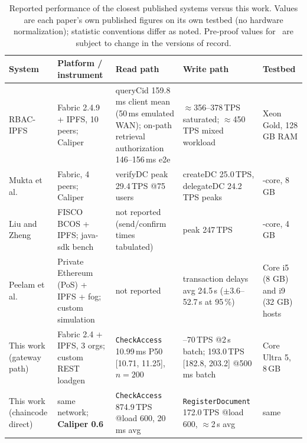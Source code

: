 \documentclass[preprint,12pt]{elsarticle}
\begin{document}
\begin{table}[!t]
\centering
\scriptsize
\renewcommand{\arraystretch}{1.25}
\caption{Reported performance of the closest published systems versus
this work. Values are each paper's own published figures on its own
testbed (no hardware normalization); statistic conventions differ as
noted. Pre-proof values for~\cite{liu2026rbacipfs,notash2026adaptive}
are subject to change in the versions of record.}
\label{tab:numbers_comparison}
\begin{tabularx}{\textwidth}{@{} >{\raggedright\arraybackslash}p{2.4cm}
  >{\raggedright\arraybackslash}p{2.4cm}
  >{\raggedright\arraybackslash}X
  >{\raggedright\arraybackslash}X
  >{\raggedright\arraybackslash}p{2.1cm} @{}}
\toprule
\textbf{System} & \textbf{Platform / instrument} &
\textbf{Read path} & \textbf{Write path} & \textbf{Testbed} \\
\midrule
RBAC-IPFS~\cite{liu2026rbacipfs} &
Fabric 2.4.9 + IPFS, 10 peers; Caliper &
queryCid 159.8\,ms client mean (50\,ms emulated WAN); on-path retrieval
authorization 146--156\,ms e2e &
$\approx$356--378\,TPS saturated; $\approx$450\,TPS mixed workload &
Xeon Gold, 128 GB RAM \\
Mukta et al.~\cite{mukta2026zerotrust} &
Fabric, 4 peers; Caliper &
verifyDC peak 29.4\,TPS @75 users &
createDC 25.0\,TPS, delegateDC 24.2\,TPS peaks &
4-core, 8\,GB \\
Liu and Zheng~\cite{liu2024blockchain} &
FISCO BCOS + IPFS; java-sdk bench &
not reported (send/confirm times tabulated) &
peak 247\,TPS &
2-core, 4\,GB \\
Peelam et al.~\cite{peelam2026decentralized} &
Private Ethereum (PoS) + IPFS + fog; custom simulation &
not reported &
transaction delays avg 24.5\,s ($\pm$3.6--52.7\,s at 95\,\%) &
Core i5 (8 GB) and i9 (32 GB) hosts \\
\midrule
This work (gateway path) &
Fabric 2.4 + IPFS, 3 orgs; custom REST loadgen &
\texttt{CheckAccess} 10.99\,ms P50 [10.71, 11.25], $n{=}200$ &
66--70\,TPS @2\,s batch; 193.0\,TPS [182.8, 203.2] @500\,ms batch &
Core Ultra 5, 8\,GB \\
This work (chaincode direct) &
same network; \textbf{Caliper 0.6} &
\texttt{CheckAccess} 874.9\,TPS @load 600, 20\,ms avg &
\texttt{RegisterDocument} 172.0\,TPS @load 600, $\approx$2\,s avg &
same \\
\bottomrule
\end{tabularx}
\end{table}

\end{document}
